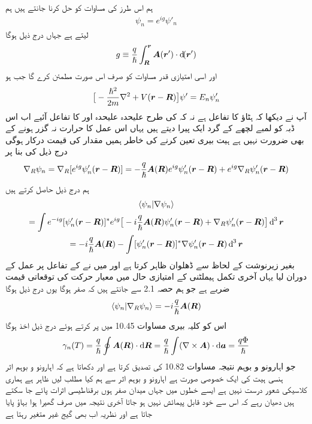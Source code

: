 ہم اس طرز کی مساوات کو حل کرنا جانتے ہیں ہم
\begin{align}
\psi_n = e^{i g} \psi'_n
\end{align}
لیتے ہے جہاں درج ذیل ہوگا 
\begin{align}
g \equiv \frac{q}{\hslash} \int_{\kvec{R}}^{\kvec{r}} \kvec{A} (\kvec{r}') \cdot \dif (\kvec{r}')
\end{align}
اور  اسی امتیازی قدر مساوات کو صرف اس صورت مطمئن کرے گا جب  ہو 
\begin{align}
\big [ - \frac{\hslash^2}{2m} \nabla^2 + V ({{\boldsymbol{r}}} - {{\boldsymbol{R}}}) \big ] \psi' = E_n \psi'_n
\end{align}
آپ نے دیکھا کہ  ہٹاؤ  کا تفاعل ہے نہ کہ  کی طرح علیحدہ علیحدہ  اور  کا تفاعل آئیے اب اس ڈبہ کو لمبے لچھے کے گرد ایک پیرا دیتے ہیں یہاں اس عمل کا حرارت نہ گزر ہونے کے بھی ضرورت نہیں ہے ہیت بیری تعین کرنے کی خاطر ہمیں مقدار  کی قیمت درکار ہوگی درج ذیل کی بنا پر 
\begin{align*}
\nabla_R \psi_n = \nabla_R [e^{i g} \psi'_n ({{\boldsymbol{r}}} - {{\boldsymbol{R}}})] = - \frac{q}{\hslash} {{\boldsymbol{A}}} ({{\boldsymbol{R}}}) e^{i g} \psi'_n ({{\boldsymbol{r}}} - {{\boldsymbol{R}}}) + e^{i g} \nabla_R \psi'_n ({{\boldsymbol{r}}} - {{\boldsymbol{R}}})
\end{align*}
ہم درج ذیل حاصل کرتے ہیں 
\begin{multline}
\langle \psi_n | \nabla \psi_n \rangle \\
= \int e^{- i g} [\psi'_n (\kvec{r} - \kvec{R})]^{*} e^{i g} \big [ - i \frac{q}{\hslash} \kvec{A} (\kvec{R}) \psi'_n (\kvec{r} - \kvec{R}) + \nabla_R \psi'_n (\kvec{r} - \kvec{R}) \big ] \dif^{\,3} \kvec{r} \\
= - i \frac{q}{\hslash} \kvec{A} (\kvec{R}) - \int [\psi'_n (\kvec{r} - \kvec{R})]^{*} \nabla \psi'_n (\kvec{r} - \kvec{R}) \dif^{\,3} \kvec{r}
\end{multline}
بغیر زیرنوشت   کے لحاظ سے ڈھلوان ظاہر کرتا ہے اور میں نے  کے تفاعل پر عمل کے دوران  لیا یہاں آخری تکمل ہیملٹنی  کے امتیازی حال میں معیار حرکت کی توقعاتی قیمت ضربے  ہے جو ہم حصہ 2.1 سے جانتے ہیں کہ صفر ہوگا یوں درج ذیل ہوگا 
\begin{align}
\langle \psi_n | \nabla_R \psi_n \rangle = - i \frac{q}{\hslash} {{\boldsymbol{A}}} ({{\boldsymbol{R}}})
\end{align}
اس کو کلیہ بیری مساوات 10.45 میں پر کرتے ہوئے درج ذیل اخذ ہوگا 
\begin{align}
\gamma_n (T) = \frac{q}{\hslash} \oint \kvec{A} (\kvec{R}) \cdot \dif \kvec{R} = \frac{q}{\hslash} \int (\nabla \times \kvec{A}) \cdot \dif \kvec{a} = \frac{q \Phi}{\hslash}
\end{align}
جو اہارونو و بوہم نتیجہ مساوات 10.82 کی تصدیق کرتا ہے اور دکھاتا ہے کہ اہارونو و بوہم اثر ہنسی ہیت کی ایک خصوصی صورت ہے اہارونو و بوہم اثر سے ہم کیا مطلب ليں ظاہر ہے ہماری کلاسیکی شعور درست نہیں ہے ایسے خطوں میں جہاں میدان صفر ہوں برقناطیسی اثرات پائے جا سکتے ہیں دھیان رہے کہ اس سے  خود قابل پیمائش نہیں ہو جاتا آخری نتیجہ میں صرف گھیرا ہوا بہاؤ پایا جاتا ہے اور نظریہ اب بھی گیج غیر متغیر رہتا ہے 

